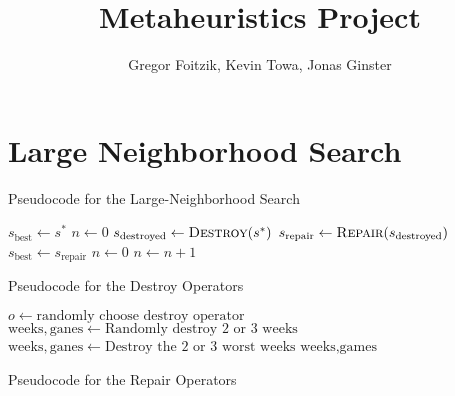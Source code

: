 \documentclass[12pt]{article}
\title{Metaheuristics Project}
\author{Gregor Foitzik, Kevin Towa, Jonas Ginster}
\begin{document}
\maketitle
\section{Large Neighborhood Search}
\begin{algorithm}
    \caption{Pseudocode for the Large-Neighborhood Search}
    \begin{algorithmic}[1]
            \State $s_{\text{best}}\leftarrow s^*$
            \State $n\leftarrow 0$
             
                \State $s_{\text{destroyed}}\leftarrow \Call{Destroy}{s^*}$ 
                \State $s_{\text{repair}}\leftarrow \Call{Repair}{s_{\text{destroyed}}}$
                    \State $s_{\text{best}} \leftarrow s_{\text{repair}}$
                    \State $n\leftarrow 0$
                \Else
                    \State $n\leftarrow n + 1$ 
                \EndIf
            \EndWhile
        \EndFunction
    \end{algorithmic}
\end{algorithm}


\begin{algorithm}
    \caption{Pseudocode for the Destroy Operators}
    \begin{algorithmic}[1] 
            \State $o\leftarrow \text{randomly choose destroy operator}$
                \State $\text{weeks}, \text{ganes}\leftarrow \text{Randomly destroy 2 or 3 weeks}$
                \State $\text{weeks}, \text{ganes}\leftarrow \text{Destroy the 2 or 3 worst weeks}$
            \EndIf
            \Return $\text{weeks}, \text{games}$
        \EndFunction
    \end{algorithmic}
\end{algorithm}


\begin{algorithm}
    \caption{Pseudocode for the Repair Operators}
    \begin{algorithmic}[1] 
        \EndFunction
    \end{algorithmic}
\end{algorithm}
\end{document}
